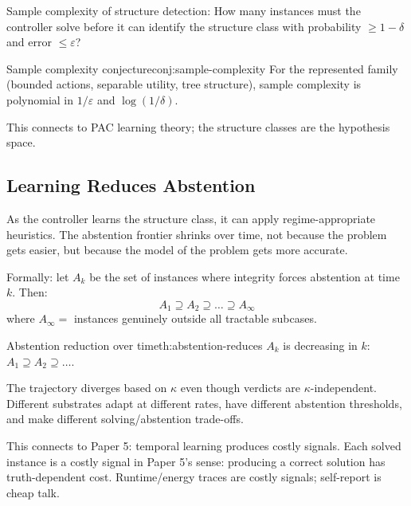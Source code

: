 Sample complexity of structure detection:
How many instances must the controller solve before it can identify the structure class with probability $\geq 1 - \delta$ and error $\leq \varepsilon$?

\begin{claim}{Sample complexity conjecture}{conj:sample-complexity}
For the represented family (bounded actions, separable utility, tree structure), sample complexity is polynomial in $1/\varepsilon$ and $\log(1/\delta)$.
\end{claim}

This connects to PAC learning theory; the structure classes are the hypothesis space.

\subsection{Learning Reduces Abstention}

As the controller learns the structure class, it can apply regime-appropriate heuristics. The abstention frontier shrinks over time, not because the problem gets easier, but because the model of the problem gets more accurate.

Formally: let $A_k$ be the set of instances where integrity forces abstention at time $k$. Then:
\[
A_1 \supseteq A_2 \supseteq \ldots \supseteq A_\infty
\]
where $A_\infty =$ instances genuinely outside all tractable subcases.

\begin{claim}{Abstention reduction over time}{th:abstention-reduces}
$A_k$ is decreasing in $k$: $A_1 \supseteq A_2 \supseteq \ldots$.
\end{claim}


The trajectory diverges based on $\kappa$ even though verdicts are $\kappa$-independent. Different substrates adapt at different rates, have different abstention thresholds, and make different solving/abstention trade-offs.

This connects to Paper 5: temporal learning produces costly signals. Each solved instance is a costly signal in Paper 5's sense: producing a correct solution has truth-dependent cost. Runtime/energy traces are costly signals; self-report is cheap talk.
